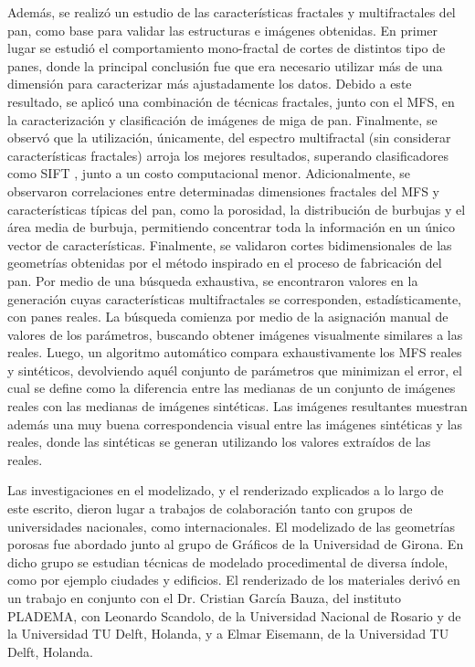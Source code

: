 Además, se realizó un estudio de las características fractales y multifractales del pan, como base para validar las estructuras e imágenes obtenidas.
En primer lugar se estudió el comportamiento mono-fractal de cortes de distintos tipo de panes, donde la principal conclusión fue que era necesario utilizar más de una dimensión para caracterizar más ajustadamente los datos.
Debido a este resultado, se aplicó una combinación de técnicas fractales, junto con el MFS, en la caracterización y clasificación de imágenes de miga de pan. Finalmente, se observó que la utilización, únicamente, del espectro multifractal (sin considerar características fractales) arroja los mejores resultados, superando clasificadores como SIFT \cite{Lowe2004}, junto a un costo computacional menor.
Adicionalmente, se observaron correlaciones entre determinadas dimensiones fractales del MFS y características típicas del pan, como la porosidad, la distribución de burbujas y el área media de burbuja, permitiendo concentrar toda la información en un único vector de características.
Finalmente, se validaron cortes bidimensionales de las geometrías obtenidas por el método inspirado en el proceso de fabricación del pan.
Por medio de una búsqueda exhaustiva, se encontraron valores en la generación cuyas características multifractales se corresponden, estadísticamente, con panes reales.
La búsqueda comienza por medio de la asignación manual de valores de los parámetros, buscando obtener imágenes visualmente similares a las reales.
Luego, un algoritmo automático compara exhaustivamente los MFS reales y sintéticos, devolviendo aquél conjunto de parámetros que minimizan el error, el cual se define como la diferencia entre las medianas de un conjunto de imágenes reales con las medianas de imágenes sintéticas.
Las imágenes resultantes muestran además una muy buena correspondencia visual entre las imágenes sintéticas y las reales, donde las sintéticas se generan utilizando los valores extraídos de las reales.

Las investigaciones en el modelizado, y el renderizado explicados a lo largo de este escrito, dieron lugar a trabajos de colaboración tanto con grupos de universidades nacionales, como internacionales.
El modelizado de las geometrías porosas fue abordado junto al grupo de Gráficos de la Universidad de Girona.
En dicho grupo se estudian técnicas de modelado procedimental de diversa índole, como por ejemplo ciudades y edificios.
El renderizado de los materiales derivó en un trabajo en conjunto con el Dr. Cristian García Bauza, del instituto PLADEMA, con Leonardo Scandolo, de la Universidad Nacional de Rosario y de la Universidad TU Delft, Holanda, y a Elmar Eisemann, de la Universidad TU Delft, Holanda.



